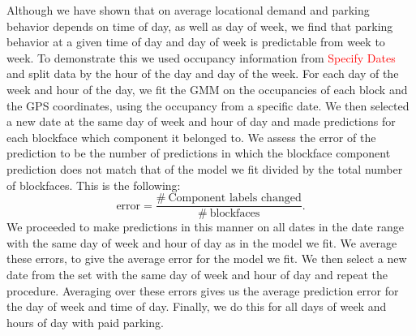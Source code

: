 \documentclass{article}
\begin{document}
Although we have shown that on average locational demand and parking behavior depends on time of day, as well as day of week, we find that parking behavior at a given time of day and day of week is predictable from week to week. To demonstrate this we used occupancy information from \textcolor{red}{Specify Dates} and split data by the hour of the day and day of the week. For each day of the week and hour of the day, we fit the GMM on the occupancies of each block and the GPS coordinates, using the occupancy from a specific date. We then selected a new date at the same day of week and hour of day and made predictions for each blockface which component it belonged to. We assess the error of the prediction to be the number of predictions in which the blockface component prediction does not match that of the model we fit divided by the total number of blockfaces. This is the following:
\begin{equation}
\text{error} = \frac{\# \ \text{Component labels changed}}{\# \ \text{blockfaces}}.
\end{equation}
We proceeded to make predictions in this manner on all dates in the date range with the same day of week and hour of day as in the model we fit. We average these errors, to give the average error for the model we fit. We then select a new date from the set with the same day of week and hour of day and repeat the procedure. Averaging over these errors gives us the average prediction error for the day of week and time of day. Finally, we do this for all days of week and hours of day with paid parking.
\end{document}
